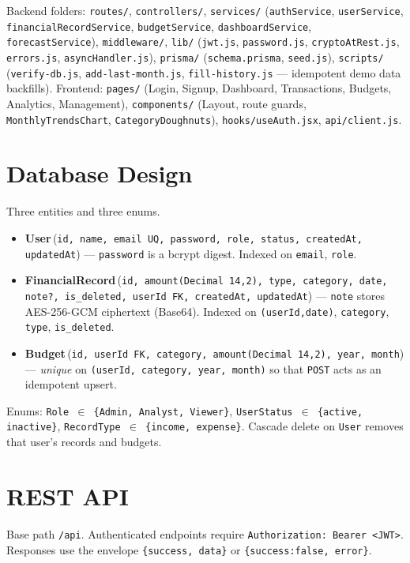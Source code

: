 \documentclass[11pt,a4paper]{article}
\newcommand{\code}[1]{\texttt{\small #1}}
\begin{document}
Backend folders: \code{routes/}, \code{controllers/},
\code{services/} (\code{authService}, \code{userService},
\code{financialRecordService}, \code{budgetService},
\code{dashboardService}, \code{forecastService}),
\code{middleware/}, \code{lib/} (\code{jwt.js}, \code{password.js},
\code{cryptoAtRest.js}, \code{errors.js}, \code{asyncHandler.js}),
\code{prisma/} (\code{schema.prisma}, \code{seed.js}),
\code{scripts/} (\code{verify-db.js}, \code{add-last-month.js},
\code{fill-history.js} --- idempotent demo data backfills). Frontend:
\code{pages/} (Login, Signup, Dashboard, Transactions, Budgets,
Analytics, Management), \code{components/} (Layout, route guards,
\code{MonthlyTrendsChart}, \code{CategoryDoughnuts}),
\code{hooks/useAuth.jsx}, \code{api/client.js}.

\section{Database Design}
Three entities and three enums.

\begin{itemize}
  \item \textbf{User}\,(\code{id, name, email\,UQ, password, role, status, createdAt, updatedAt})
        --- \code{password} is a bcrypt digest. Indexed on \code{email}, \code{role}.
  \item \textbf{FinancialRecord}\,(\code{id, amount(Decimal\,14,2), type, category, date, note?, is\_deleted, userId\,FK, createdAt, updatedAt})
        --- \code{note} stores AES-256-GCM ciphertext (Base64). Indexed
        on \code{(userId,date)}, \code{category}, \code{type},
        \code{is\_deleted}.
  \item \textbf{Budget}\,(\code{id, userId\,FK, category, amount(Decimal\,14,2), year, month})
        --- \emph{unique} on \code{(userId, category, year, month)} so that
        \code{POST} acts as an idempotent upsert.
\end{itemize}

Enums: \code{Role $\in$ \{Admin, Analyst, Viewer\}},
\code{UserStatus $\in$ \{active, inactive\}},
\code{RecordType $\in$ \{income, expense\}}. Cascade delete on
\code{User} removes that user's records and budgets.

\section{REST API}
Base path \code{/api}. Authenticated endpoints require
\code{Authorization: Bearer <JWT>}. Responses use the envelope
\code{\{success, data\}} or \code{\{success:false, error\}}.
\end{document}
